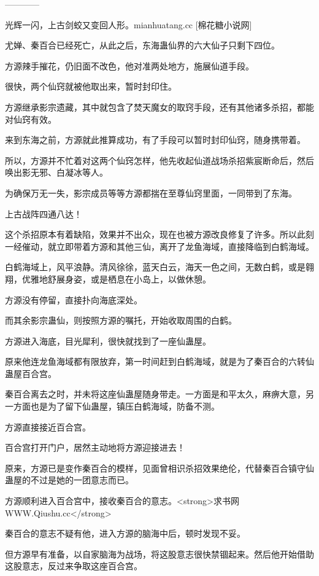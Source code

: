 
\begin{this_body}

------------

光辉一闪，上古剑蛟又变回人形。mianhuatang.cc [棉花糖小说网]

尤婵、秦百合已经死亡，从此之后，东海蛊仙界的六大仙子只剩下四位。

方源辣手摧花，仍旧面不改色，他对准两处地方，施展仙道手段。

很快，两个仙窍就被他取出来，暂时封印住。

方源继承影宗遗藏，其中就包含了焚天魔女的取窍手段，还有其他诸多杀招，都能对仙窍有效。

来到东海之前，方源就此推算成功，有了手段可以暂时封印仙窍，随身携带着。

所以，方源并不忙着对这两个仙窍怎样，他先收起仙道战场杀招紫宸断命后，然后唤出影无邪、白凝冰等人。

为确保万无一失，影宗成员等等方源都揣在至尊仙窍里面，一同带到了东海。

上古战阵四通八达！

这个杀招原本有着缺陷，效果并不出众，现在也被方源改良修复了许多。所以此刻一经催动，就立即带着方源和其他三仙，离开了龙鱼海域，直接降临到白鹤海域。

白鹤海域上，风平浪静。清风徐徐，蓝天白云，海天一色之间，无数白鹤，或是翱翔，优雅地舒展身姿，或是栖息在小岛上，以做休憩。

方源没有停留，直接扑向海底深处。

而其余影宗蛊仙，则按照方源的嘱托，开始收取周围的白鹤。

方源进入海底，目光犀利，很快就找到了一座仙蛊屋。

原来他连龙鱼海域都有限放弃，第一时间赶到白鹤海域，就是为了秦百合的六转仙蛊屋百合宫。

秦百合离去之时，并未将这座仙蛊屋随身带走。一方面是和平太久，麻痹大意，另一方面也是为了留下仙蛊屋，镇压白鹤海域，防备不测。

方源直接接近百合宫。

百合宫打开门户，居然主动地将方源迎接进去！

原来，方源已是变作秦百合的模样，见面曾相识杀招效果绝伦，代替秦百合镇守仙蛊屋的不过是她的一团意志而已。

方源顺利进入百合宫中，接收秦百合的意志。<strong>求书网WWW.Qiushu.cc</strong>

秦百合的意志不疑有他，进入方源的脑海中后，顿时发现不妥。

但方源早有准备，以自家脑海为战场，将这股意志很快禁锢起来。然后他开始借助这股意志，反过来争取这座百合宫。


\end{this_body}
